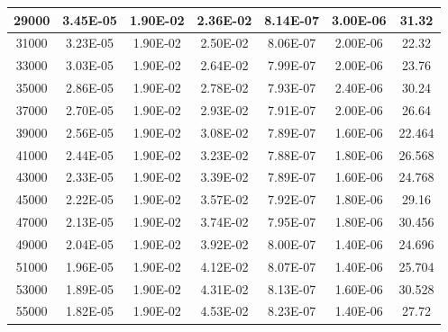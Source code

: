 \documentclass[11pt, a4paper, twocolumn]{article}
\begin{document}
\begin{table}[H]
{\begin{tabular}{|c|c|c|c|c|c|c|}
29000          & 3.45E-05               & 1.90E-02                      & 2.36E-02        & 8.14E-07            & 3.00E-06     & 31.32       \\ \hline
31000          & 3.23E-05               & 1.90E-02                      & 2.50E-02        & 8.06E-07            & 2.00E-06     & 22.32       \\ \hline
33000          & 3.03E-05               & 1.90E-02                      & 2.64E-02        & 7.99E-07            & 2.00E-06     & 23.76       \\ \hline
35000          & 2.86E-05               & 1.90E-02                      & 2.78E-02        & 7.93E-07            & 2.40E-06     & 30.24       \\ \hline
37000          & 2.70E-05               & 1.90E-02                      & 2.93E-02        & 7.91E-07            & 2.00E-06     & 26.64       \\ \hline
39000          & 2.56E-05               & 1.90E-02                      & 3.08E-02        & 7.89E-07            & 1.60E-06     & 22.464      \\ \hline
41000          & 2.44E-05               & 1.90E-02                      & 3.23E-02        & 7.88E-07            & 1.80E-06     & 26.568      \\ \hline
43000          & 2.33E-05               & 1.90E-02                      & 3.39E-02        & 7.89E-07            & 1.60E-06     & 24.768      \\ \hline
45000          & 2.22E-05               & 1.90E-02                      & 3.57E-02        & 7.92E-07            & 1.80E-06     & 29.16       \\ \hline
47000          & 2.13E-05               & 1.90E-02                      & 3.74E-02        & 7.95E-07            & 1.80E-06     & 30.456      \\ \hline
49000          & 2.04E-05               & 1.90E-02                      & 3.92E-02        & 8.00E-07            & 1.40E-06     & 24.696      \\ \hline
51000          & 1.96E-05               & 1.90E-02                      & 4.12E-02        & 8.07E-07            & 1.40E-06     & 25.704      \\ \hline
53000          & 1.89E-05               & 1.90E-02                      & 4.31E-02        & 8.13E-07            & 1.60E-06     & 30.528      \\ \hline
55000          & 1.82E-05               & 1.90E-02                      & 4.53E-02        & 8.23E-07            & 1.40E-06     & 27.72       \\ \hline

\end{tabular}}
\end{table}
\end{document}
